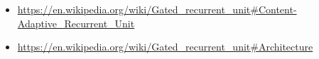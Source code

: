 
\begin{itemize}
    \item \url{https://en.wikipedia.org/wiki/Gated_recurrent_unit#Content-Adaptive_Recurrent_Unit}
    \item \url{https://en.wikipedia.org/wiki/Gated_recurrent_unit#Architecture}
\end{itemize}